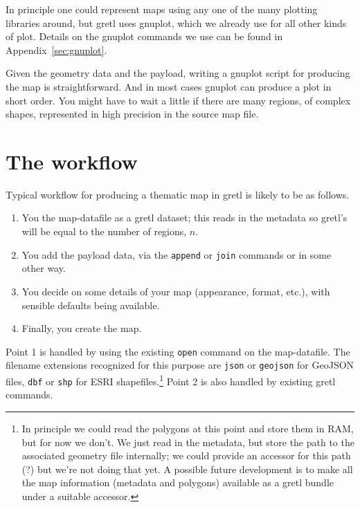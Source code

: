 \documentclass{article}
\begin{document}
In principle one could represent maps using any one of the many
plotting libraries around, but gretl uses \textsf{gnuplot}, which we
already use for all other kinds of plot. Details on the
\textsf{gnuplot} commands we use can be found in
Appendix~\ref{sec:gnuplot}.

Given the geometry data and the payload, writing a \textsf{gnuplot}
script for producing the map is straightforward. And in most cases
\textsf{gnuplot} can produce a plot in short order. You might have to
wait a little if there are many regions, of complex shapes,
represented in high precision in the source map file.

\section{The workflow}
\label{sec:workflow}

Typical workflow for producing a thematic map in gretl is likely to be
as follows.

\begin{enumerate}
\item You  the map-datafile as a gretl dataset; this reads
  in the metadata so gretl's  will be equal to the number
  of regions, $n$.
\item You add the payload data, via the \texttt{append} or
  \texttt{join} commands or in some other way.
\item You decide on some details of your map (appearance, format,
  etc.), with sensible defaults being available.
\item Finally, you create the map.
\end{enumerate}

Point 1 is handled by using the existing \texttt{open} command on the
map-datafile. The filename extensions recognized for this purpose are
\texttt{json} or \texttt{geojson} for GeoJSON files, \texttt{dbf} or
\texttt{shp} for ESRI shapefiles.\footnote{In principle we could read
  the polygons at this point and store them in RAM, but for now we
  don't. We just read in the metadata, but store the path to the
  associated geometry file internally; we could provide an accessor
  for this path (?) but we're not doing that yet. A
  possible future development is to make all the map information
  (metadata and polygons) available as a gretl bundle under a suitable
  accessor.} Point 2 is also handled by existing gretl commands.
\end{document}
